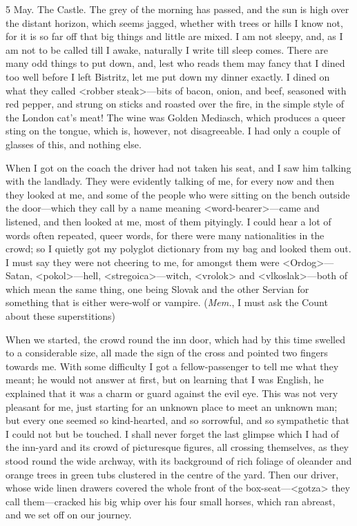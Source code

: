 \begin{diary}{5 May. The Castle.}
The grey of the morning has passed, and the sun is high over the distant horizon, which seems jagged, whether with trees or hills I know not, for it is so far off that big things and little are mixed. I am not sleepy, and, as I am not to be called till I awake, naturally I write till sleep comes. There are many odd things to put down, and, lest who reads them may fancy that I dined too well before I left Bistritz, let me put down my dinner exactly. I dined on what they called <robber steak>—bits of bacon, onion, and beef, seasoned with red pepper, and strung on sticks and roasted over the fire, in the simple style of the London cat's meat! The wine was Golden Mediasch, which produces a queer sting on the tongue, which is, however, not disagreeable. I had only a couple of glasses of this, and nothing else.

When I got on the coach the driver had not taken his seat, and I saw him talking with the landlady. They were evidently talking of me, for every now and then they looked at me, and some of the people who were sitting on the bench outside the door—which they call by a name meaning <word-bearer>—came and listened, and then looked at me, most of them pityingly. I could hear a lot of words often repeated, queer words, for there were many nationalities in the crowd; so I quietly got my polyglot dictionary from my bag and looked them out. I must say they were not cheering to me, for amongst them were <Ordog>—Satan, <pokol>—hell, <stregoica>—witch, <vrolok> and <vlkoslak>—both of which mean the same thing, one being Slovak and the other Servian for something that is either were-wolf or vampire. (\textit{Mem.}, I must ask the Count about these superstitions)

When we started, the crowd round the inn door, which had by this time swelled to a considerable size, all made the sign of the cross and pointed two fingers towards me. With some difficulty I got a fellow-passenger to tell me what they meant; he would not answer at first, but on learning that I was English, he explained that it was a charm or guard against the evil eye. This was not very pleasant for me, just starting for an unknown place to meet an unknown man; but every one seemed so kind-hearted, and so sorrowful, and so sympathetic that I could not but be touched. I shall never forget the last glimpse which I had of the inn-yard and its crowd of picturesque figures, all crossing themselves, as they stood round the wide archway, with its background of rich foliage of oleander and orange trees in green tubs clustered in the centre of the yard. Then our driver, whose wide linen drawers covered the whole front of the box-seat—<gotza> they call them—cracked his big whip over his four small horses, which ran abreast, and we set off on our journey.


\end{diary}
